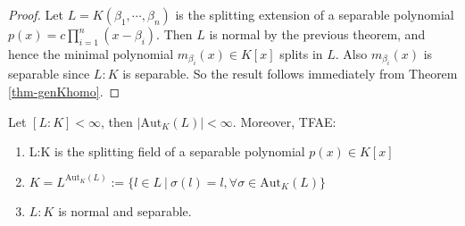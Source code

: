 \begin{proof}
    Let $L=K(\beta_1,\cdots,\beta_n)$ is the splitting extension of a separable polynomial $p(x)=c\prod_{i=1}^n (x-\beta_i)$. Then $L$ is normal by the previous theorem, and hence the minimal polynomial $m_{\beta_i}(x) \in K[x]$ 
    splits in $L$. Also $m_{\beta_i}(x)$ is separable since $L:K$ is separable. So the result follows immediately from Theorem \ref{thm-genKhomo}.
\end{proof}
\begin{theorem} \label{thm-galcondition}
    Let $[L:K] < \infty$, then $|\mathrm{Aut}_K(L)| < \infty$. Moreover, TFAE:
    \begin{enumerate}
        \item L:K is the splitting field of a separable polynomial $p(x)\in K[x]$
        \item  $K=L^{\mathrm{Aut}_K(L)} :=\{l\in L\ |\ \sigma(l)=l,\forall \sigma \in \mathrm{Aut}_K(L)\}$
        \item $L:K$ is normal and separable.
    \end{enumerate}
    
\end{theorem}
